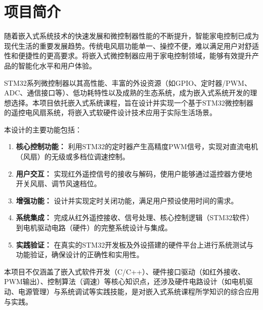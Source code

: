 
\section{项目简介}

随着嵌入式系统技术的快速发展和微控制器性能的不断提升，智能家电控制已成为现代生活的重要发展趋势。传统电风扇功能单一、操控不便，难以满足用户对舒适性和便捷性的更高要求。将嵌入式微控制器应用于家电控制领域，能够有效提升产品的智能化水平和用户体验。

STM32系列微控制器以其高性能、丰富的外设资源（如GPIO、定时器/PWM、ADC、通信接口等）、低功耗特性以及成熟的生态系统，成为嵌入式系统开发的理想选择。本项目依托嵌入式系统课程，旨在设计并实现一个基于STM32微控制器的遥控电风扇系统，将嵌入式软硬件设计技术应用于实际生活场景。

本设计的主要功能包括：
\begin{enumerate}
    \item \textbf{核心控制功能：} 利用STM32的定时器产生高精度PWM信号，实现对直流电机（风扇）的无级或多档位调速控制。
    \item \textbf{用户交互：} 实现红外遥控信号的接收与解码，使用户能够通过遥控器方便地开关风扇、调节风速档位。
    \item \textbf{增强功能：} 设计并实现定时关闭功能，满足用户预设使用时间的需求。
    \item \textbf{系统集成：} 完成从红外遥控接收、信号处理、核心控制逻辑（STM32软件）到电机驱动电路（硬件）的完整系统设计与集成。
    \item \textbf{实践验证：} 在真实的STM32开发板及外设搭建的硬件平台上进行系统测试与功能验证，确保设计的正确性和实用性。
\end{enumerate}

本项目不仅涵盖了嵌入式软件开发（C/C++）、硬件接口驱动（如红外接收、PWM输出）、控制算法（调速）等核心知识点，还涉及硬件电路设计（如电机驱动、电源管理）与系统调试等实践技能，是对嵌入式系统课程所学知识的综合应用与实践。

